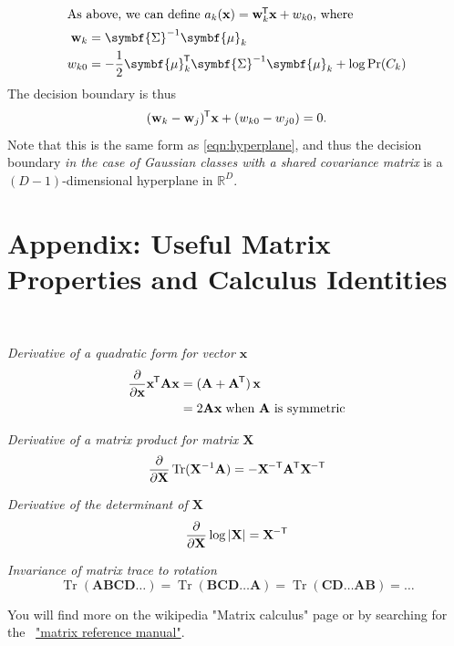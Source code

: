 \documentclass[11pt]{article}
\DeclareMathOperator{\Tr}{Tr}
\newcommand{\logdet}[1]{\log \left| {#1} \right| }
\newcommand{\xb}{\mathbf{x}}
\newcommand{\ub}{\symbf{\mu}}
\newcommand{\Sb}{\symbf{\Sigma}}
\newcommand*{\tran}{^{\mkern-1.5mu\mathsf{T}}}
\newcommand*{\invtran}{^{\mkern-1.5mu\mathsf{-T}}}
\begin{document}
\begin{align*}
	\intertext{As above, we can define $a_k(\xb) = \mathbf{w}_k\tran \xb + w_{k0}$, where}
	\mathbf{w}_k &= \Sb^{-1} \ub_k \\
	w_{k0} &= - \frac{1}{2} \ub_k \tran \Sb^{-1} \ub_k + \log \Pr(C_k)
\end{align*}
The decision boundary is thus
\begin{equation}
	(\mathbf{w}_k - \mathbf{w}_j)\tran \xb + (w_{k0} - w_{j0})  = 0.
\end{equation}
Note that this is the same form as \eqref{eqn:hyperplane}, and thus the decision boundary \textit{in the case of Gaussian classes 
with a shared covariance matrix} is a $(D-1)$-dimensional hyperplane in $\mathbb{R}^D$.

\section*{Appendix: Useful Matrix Properties and Calculus Identities}
$\quad$
\begin{center}
\begin{minipage}{0.75\linewidth}
\textit{Derivative of a quadratic form for vector $\xb$}
\begin{equation}
	\begin{split}
	\frac{\partial}{\partial \xb} \xb\tran \mathbf{A} \xb &= (\mathbf{A} + \mathbf{A}\tran) \, \xb \\
	&= 2 \mathbf{A} \xb \; \text{when $\mathbf{A}$ is symmetric}
	\end{split}
\end{equation}

\textit{Derivative of a matrix product for matrix $\mathbf{X}$}
\begin{equation}
	\frac{\partial}{\partial \mathbf{X}} \Tr(\mathbf{X}^{-1} \mathbf{A}) = -\mathbf{X}\invtran \mathbf{A}\tran \mathbf{X}\invtran
\end{equation}

\textit{Derivative of the determinant of $\mathbf{X}$}
\begin{equation}
	\frac{\partial}{\partial \mathbf{X}} \logdet{\mathbf{X}} = \mathbf{X}\invtran
\end{equation}

\textit{Invariance of matrix trace to rotation}	
\begin{equation}
	\Tr(\mathbf{A} \mathbf{B} \mathbf{C} \mathbf{D} \ldots) = \Tr(\mathbf{B} \mathbf{C} \mathbf{D} \ldots \mathbf{A}) = 
	\Tr(\mathbf{C} \mathbf{D} \ldots \mathbf{A}  \mathbf{B}) = \ldots
\end{equation}

You will find more on the wikipedia "Matrix calculus" page or by searching for the \
\href{http://www.ee.ic.ac.uk/hp/staff/dmb/matrix/intro.html}{"matrix reference manual"}.
\end{minipage}
\end{center}
\end{document}
